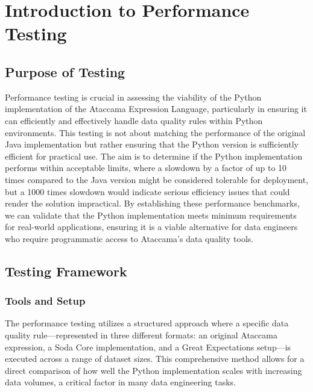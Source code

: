 


\section{Introduction to Performance Testing}

\subsection{Purpose of Testing}


Performance testing is crucial in assessing the viability of the Python implementation of the Ataccama Expression Language, particularly in ensuring it can efficiently and effectively handle data quality rules within Python environments. This testing is not about matching the performance of the original Java implementation but rather ensuring that the Python version is sufficiently efficient for practical use. The aim is to determine if the Python implementation performs within acceptable limits, where a slowdown by a factor of up to 10 times compared to the Java version might be considered tolerable for deployment, but a 1000 times slowdown would indicate serious efficiency issues that could render the solution impractical. By establishing these performance benchmarks, we can validate that the Python implementation meets minimum requirements for real-world applications, ensuring it is a viable alternative for data engineers who require programmatic access to Ataccama's data quality tools.

\subsection{Testing Framework}

\subsubsection{Tools and Setup}

The performance testing utilizes a structured approach where a specific data quality rule—represented in three different formats: an original Ataccama expression, a Soda Core implementation, and a Great Expectations setup—is executed across a range of dataset sizes. This comprehensive method allows for a direct comparison of how well the Python implementation scales with increasing data volumes, a critical factor in many data engineering tasks.

